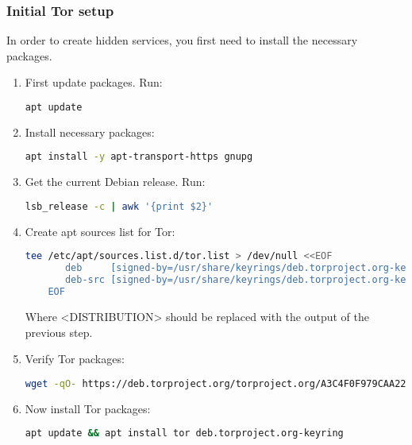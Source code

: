 \subsubsection{Initial Tor setup}
In order to create hidden services, you first need to install the necessary packages.
\begin{enumerate}
    \item First update packages. Run:
    \begin{lstlisting}[language=bash]
    apt update
    \end{lstlisting}
    \item Install necessary packages:
    \begin{lstlisting}[language=bash]
    apt install -y apt-transport-https gnupg
    \end{lstlisting}
    \item Get the current Debian release. Run:
    \begin{lstlisting}[language=bash]
    lsb_release -c | awk '{print $2}'
    \end{lstlisting}
    \item Create apt sources list for Tor:
    \begin{lstlisting}[language=bash, breaklines=true, breakatwhitespace=true, columns=flexible]
    tee /etc/apt/sources.list.d/tor.list > /dev/null <<EOF
       deb     [signed-by=/usr/share/keyrings/deb.torproject.org-keyring.gpg] https://deb.torproject.org/torproject.org <DISTRIBUTION> main
       deb-src [signed-by=/usr/share/keyrings/deb.torproject.org-keyring.gpg] https://deb.torproject.org/torproject.org <DISTRIBUTION> main
    EOF
    \end{lstlisting}
    Where <DISTRIBUTION> should be replaced with the output of the previous step.
    \item Verify Tor packages:
    {\footnotesize
    \begin{lstlisting}[language=bash, breaklines=true, columns=flexible]
    wget -qO- https://deb.torproject.org/torproject.org/A3C4F0F979CAA22CDBA8F512EE8CBC9E886DDD89.asc | gpg --dearmor | tee /usr/share/keyrings/deb.torproject.org-keyring.gpg >/dev/null
    \end{lstlisting}
    }
    \item Now install Tor packages:
    \begin{lstlisting}[language=bash]
    apt update && apt install tor deb.torproject.org-keyring
    \end{lstlisting}
\end{enumerate}

